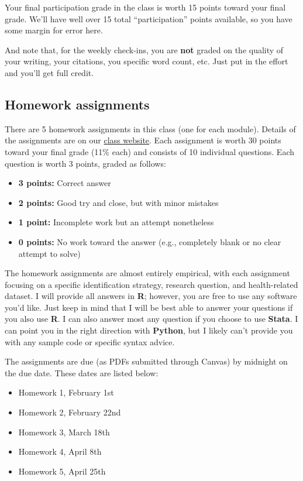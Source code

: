 \documentclass[11pt,]{article}
\providecommand{\tightlist}{%
  \setlength{\itemsep}{0pt}\setlength{\parskip}{0pt}}
\begin{document}
Your final participation grade in the class is worth 15 points toward
your final grade. We'll have well over 15 total ``participation'' points
available, so you have some margin for error here.

And note that, for the weekly check-ins, you are \textbf{not} graded on
the quality of your writing, your citations, you specific word count,
etc. Just put in the effort and you'll get full credit.

\hypertarget{homework-assignments}{%
\subsection{Homework assignments}\label{homework-assignments}}

There are 5 homework assignments in this class (one for each module).
Details of the assignments are on our
\href{https://econ470s22.classes.ianmccarthyecon.com/}{class website}.
Each assignment is worth 30 points toward your final grade (11\% each)
and consists of 10 individual questions. Each question is worth 3
points, graded as follows:

\begin{itemize}
\tightlist
\item
  \textbf{3 points:} Correct answer
\item
  \textbf{2 points:} Good try and close, but with minor mistakes
\item
  \textbf{1 point:} Incomplete work but an attempt nonetheless
\item
  \textbf{0 points:} No work toward the answer (e.g., completely blank
  or no clear attempt to solve)
\end{itemize}

The homework assignments are almost entirely empirical, with each
assignment focusing on a specific identification strategy, research
question, and health-related dataset. I will provide all answers in
\textbf{R}; however, you are free to use any software you'd like. Just
keep in mind that I will be best able to answer your questions if you
also use \textbf{R}. I can also answer most any question if you choose
to use \textbf{Stata}. I can point you in the right direction with
\textbf{Python}, but I likely can't provide you with any sample code or
specific syntax advice.

The assignments are due (as PDFs submitted through Canvas) by midnight
on the due date. These dates are listed below:

\begin{itemize}
\tightlist
\item
  Homework 1, February 1st
\item
  Homework 2, February 22nd
\item
  Homework 3, March 18th
\item
  Homework 4, April 8th
\item
  Homework 5, April 25th
\end{itemize}
\end{document}
